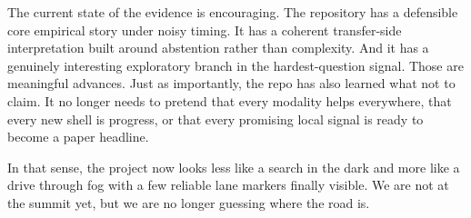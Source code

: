 \documentclass[acmsmall,screen,nonacm]{acmart}
\begin{document}
The current state of the evidence is encouraging. The repository has a defensible core empirical story under noisy timing. It has a coherent transfer-side interpretation built around abstention rather than complexity. And it has a genuinely interesting exploratory branch in the hardest-question signal. Those are meaningful advances. Just as importantly, the repo has also learned what not to claim. It no longer needs to pretend that every modality helps everywhere, that every new shell is progress, or that every promising local signal is ready to become a paper headline.

In that sense, the project now looks less like a search in the dark and more like a drive through fog with a few reliable lane markers finally visible. We are not at the summit yet, but we are no longer guessing where the road is.
\end{document}
